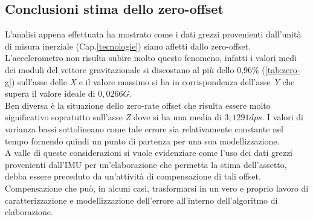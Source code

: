 \subsection{Conclusioni stima dello zero-offset}
L'analisi appena effettuata ha mostrato come i dati grezzi provenienti dall'unità di misura inerziale (Cap.\ref{tecnologie}) siano affetti dallo zero-offset.\\
L'accelerometro non risulta subire molto questo fenomeno, infatti i valori medi dei moduli del vettore gravitazionale si discostano al più dello 0,96\% (\ref{tab:zero-g}) sull'asse delle \textit{X} e il valore massimo si ha in corrispondenza dell'asse \textit{Y} che supera il valore ideale di $0,0266 G$. \\
Ben diversa è la situazione dello zero-rate offset che risulta essere molto significativo sopratutto sull'asse \textit{Z} dove si ha una media di $3,1291 dps$. I valori di varianza bassi sottolineano come tale errore sia relativamente constante nel tempo fornendo quindi un punto di partenza per una sua modellizzazione.\\
A valle di queste considerazioni si vuole evidenziare come l'uso dei dati grezzi provenienti dall'IMU per un'elaborazione che permetta la stima dell'assetto, debba essere preceduto da un'attività di compensazione di tali offset. Compensazione che può, in alcuni casi, trasformarsi in un vero e proprio lavoro di caratterizzazione e modellizzazione dell'errore all'interno dell'algoritmo di elaborazione. 





